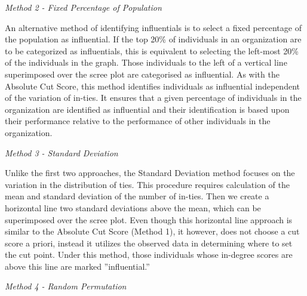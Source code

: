 {\em Method 2 - Fixed Percentage of Population}

An alternative method of identifying influentials is to select a fixed percentage of the population as influential. If the top 20\% of individuals in an organization are to be categorized as influentials, this is equivalent to selecting the left-most 20\% of the individuals in the graph. Those individuals to the left of a vertical line superimposed over the scree plot are categorised as influential. As with the Absolute Cut Score, this method identifies individuals as influential independent of the variation of in-ties. It ensures that a given percentage of individuals in the organization are identified as influential and their identification is based upon their performance relative to the performance of other individuals in the organization.

{\em Method 3 - Standard Deviation}

Unlike the first two approaches, the Standard Deviation method focuses on the variation in the distribution of ties. This procedure requires calculation of the mean and standard deviation of the number of in-ties. Then we create a horizontal line two standard deviations above the mean, which can be superimposed over the scree plot. Even though this horizontal line approach is similar to the Absolute Cut Score (Method 1), it however,  does not choose a cut score a priori, instead it utilizes the observed data in determining where to set the cut point. Under this method, those individuals whose in-degree scores are above this line are marked ”influential.”

{\em Method 4 - Random Permutation}

